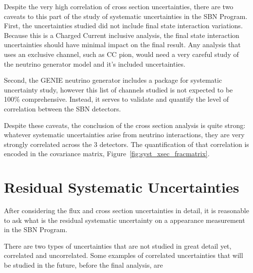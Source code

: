 Despite the very high correlation of cross section uncertainties, there are two caveats to this part of the study of systematic uncertainties in the SBN Program.  First, the uncertainties studied did not include final state interaction variations.  Because this is a Charged Current inclusive analysis, the final state interaction uncertainties should have minimal impact on the final result.  Any analysis that uses an exclusive channel, such as CC  pion, would need a very careful study of the neutrino generator model and it's included uncertainties.

Second, the GENIE neutrino generator includes a package for systematic uncertainty study, however this list of channels studied is not expected to be 100\% comprehensive.  Instead, it serves to validate and quantify the level of correlation between the SBN detectors.

Despite these caveats, the conclusion of the cross section analysis is quite strong: whatever systematic uncertainties arise from neutrino interactions, they are very strongly correlated across the 3 detectors.  The quantification of that correlation is encoded in the covariance matrix, Figure~\ref{fig:syst_xsec_fracmatrix}.

\section{Residual Systematic Uncertainties}

After considering the flux and cross section uncertainties in detail, it is reasonable to ask what is the residual systematic uncertainty on a \nue appearance measurement in the SBN Program.

There are two types of uncertainties that are not studied in great detail yet, correlated and uncorrelated.  Some examples of correlated uncertainties that will be studied in the future, before the final analysis, are

